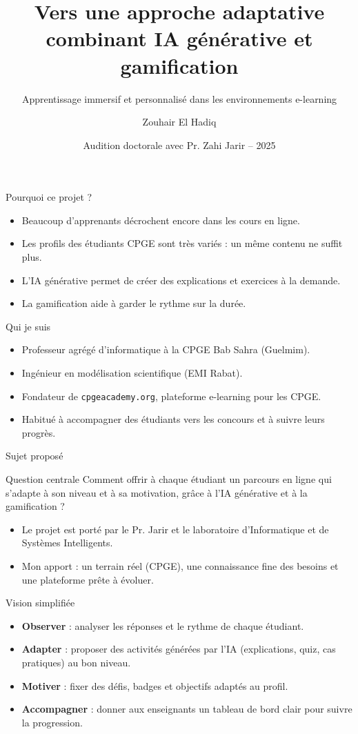 \documentclass[aspectratio=169]{beamer}
\title{Vers une approche adaptative combinant IA générative et gamification}
\subtitle{Apprentissage immersif et personnalisé dans les environnements e-learning}
\author{Zouhair El Hadiq}
\institute{Professeur agrégé d'informatique -- CPGE Bab Sahra (Guelmim)\\Fondateur de la plateforme \texttt{cpgeacademy.org}}
\date{Audition doctorale avec Pr. Zahi Jarir -- 2025}
\begin{document}
\begin{frame}
  \titlepage
\end{frame}

\begin{frame}{Pourquoi ce projet ?}
  \begin{itemize}
    \item Beaucoup d'apprenants décrochent encore dans les cours en ligne.
    \item Les profils des étudiants CPGE sont très variés : un même contenu ne suffit plus.
    \item L'IA générative permet de créer des explications et exercices à la demande.
    \item La gamification aide à garder le rythme sur la durée.
  \end{itemize}
\end{frame}

\begin{frame}{Qui je suis}
  \begin{itemize}
    \item Professeur agrégé d'informatique à la CPGE Bab Sahra (Guelmim).
    \item Ingénieur en modélisation scientifique (EMI Rabat).
    \item Fondateur de \texttt{cpgeacademy.org}, plateforme e-learning pour les CPGE.
    \item Habitué à accompagner des étudiants vers les concours et à suivre leurs progrès.
  \end{itemize}
\end{frame}

\begin{frame}{Sujet proposé}
  \begin{block}{Question centrale}
    Comment offrir à chaque étudiant un parcours en ligne qui s'adapte à son niveau et à sa motivation, grâce à l'IA générative et à la gamification ?
  \end{block}
  \begin{itemize}
    \item Le projet est porté par le Pr. Jarir et le laboratoire d'Informatique et de Systèmes Intelligents.
    \item Mon apport : un terrain réel (CPGE), une connaissance fine des besoins et une plateforme prête à évoluer.
  \end{itemize}
\end{frame}

\begin{frame}{Vision simplifiée}
  \begin{itemize}
    \item \textbf{Observer} : analyser les réponses et le rythme de chaque étudiant.
    \item \textbf{Adapter} : proposer des activités générées par l'IA (explications, quiz, cas pratiques) au bon niveau.
    \item \textbf{Motiver} : fixer des défis, badges et objectifs adaptés au profil.
    \item \textbf{Accompagner} : donner aux enseignants un tableau de bord clair pour suivre la progression.
  \end{itemize}
\end{frame}
\end{document}
